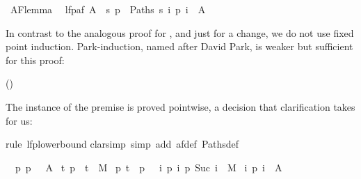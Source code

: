 \begin{isabellebody}
\isamarkuptrue%
\ AF{\isacharunderscore}lemma{}{\isacharcolon}\isanewline
\ \ {\isachardoublequote}lfp{\isacharparenleft}af\ A{\isacharparenright}\ {\isasymsubseteq}\ {\isacharbraceleft}s{\isachardot}\ {\isasymforall}p\ {\isasymin}\ Paths\ s{\isachardot}\ {\isasymexists}i{\isachardot}\ p\ i\ {\isasymin}\ A{\isacharbraceright}{\isachardoublequote}\isamarkupfalse%
%
\begin{isamarkuptxt}%
\noindent
In contrast to the analogous proof for , and just
for a change, we do not use fixed point induction.  Park-induction,
named after David Park, is weaker but sufficient for this proof:
\begin{center}
 \hfill ()
\end{center}
The instance of the premise  is proved pointwise,
a decision that clarification takes for us:%
\end{isamarkuptxt}%
\isamarkuptrue%
rule\ lfp{\isacharunderscore}lowerbound{\isacharparenright}\isanewline
\isamarkupfalse%
clarsimp\ simp\ add{\isacharcolon}\ af{\isacharunderscore}def\ Paths{\isacharunderscore}def{\isacharparenright}\isamarkupfalse%
%
\begin{isamarkuptxt}%
\begin{isabelle}%
\ {}{\isachardot}\ {\isasymAnd}p{\isachardot}\ {\isasymlbrakk}p\ {}\ {\isasymin}\ A\ {\isasymor}\isanewline
{}t{\isachardot}\ {\isacharparenleft}p\ {}{\isacharcomma}\ t{\isacharparenright}\ {\isasymin}\ M\ {\isasymlongrightarrow}\isanewline
{}p{\isachardot}\ t\ {\isacharequal}\ p\ {}\ {\isasymand}\ {\isacharparenleft}{\isasymforall}i{\isachardot}\ {\isacharparenleft}p\ i{\isacharcomma}\ p\ {\isacharparenleft}Suc\ i{\isacharparenright}{\isacharparenright}\ {\isasymin}\ M{\isacharparenright}\ {\isasymlongrightarrow}\isanewline
{}i{\isachardot}\ p\ i\ {\isasymin}\ A{\isacharparenright}{\isacharparenright}{\isacharparenright}{\isacharsemicolon}\isanewline

\end{isabelle}
\end{isamarkuptxt}
\end{isabellebody}
